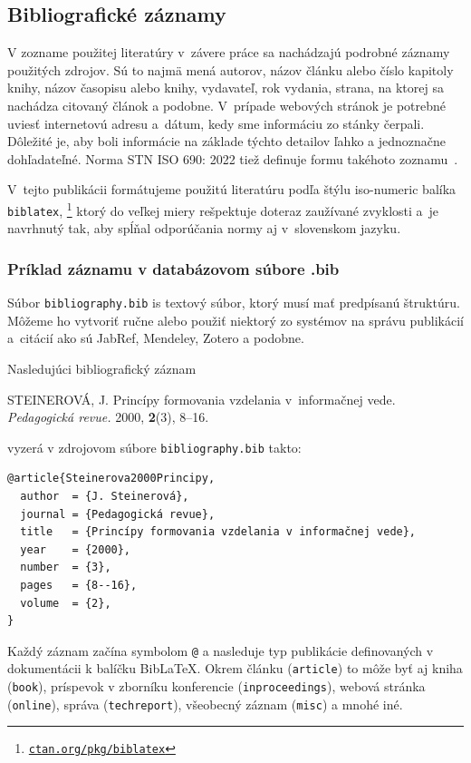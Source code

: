\documentclass[../../../thesis.tex]{subfiles}
\begin{document}
\subsection{Bibliografické záznamy}
V zozname použitej literatúry v~závere práce sa nachádzajú
podrobné záznamy použitých zdrojov.
Sú to najmä mená autorov, názov článku alebo číslo kapitoly
knihy, názov časopisu alebo knihy, vydavateľ, rok vydania,
strana, na ktorej sa nachádza citovaný článok a podobne.
V~prípade webových stránok je potrebné uviesť internetovú adresu
a~dátum, kedy sme informáciu zo stánky čerpali.
Dôležité je, aby boli informácie na základe týchto detailov
ľahko a jednoznačne dohľadateľné.
Norma STN ISO 690: 2022 tiež definuje formu takéhoto zoznamu~\cite{iso690}.

V~tejto publikácii formátujeme použitú literatúru
podľa štýlu iso-numeric \cite{Hoftich2022iso690} balíka \texttt{biblatex},
\footnote{\href{https://ctan.org/pkg/biblatex}{\texttt{ctan.org/pkg/biblatex}}}
ktorý do veľkej miery rešpektuje doteraz zaužívané zvyklosti
a~je navrhnutý tak,
aby spĺňal odporúčania normy aj v~slovenskom jazyku.

\subsubsection{Príklad záznamu v databázovom súbore .bib}\label{sec:citExample}
Súbor \texttt{bibliography.bib} is textový súbor, ktorý musí mať predpísanú štruktúru.
Môžeme ho vytvoriť ručne alebo použiť niektorý zo systémov na správu publikácií a~citácií ako sú JabRef, Mendeley, Zotero a podobne.

Nasledujúci bibliografický záznam
\begin{trivlist}
  \item STEINEROVÁ, J. Princípy formovania vzdelania
  v~informačnej vede. \textit{Pedagogická revue.} 2000, \textbf{2}(3), 8--16.
\end{trivlist}
vyzerá v zdrojovom súbore \texttt{bibliography.bib} takto:
\begin{verbatim}
@article{Steinerova2000Principy,
  author  = {J. Steinerová},
  journal = {Pedagogická revue},
  title   = {Princípy formovania vzdelania v informačnej vede},
  year    = {2000},
  number  = {3},
  pages   = {8--16},
  volume  = {2},
}
\end{verbatim}

Každý záznam začína symbolom \verb|@| a nasleduje typ publikácie definovaných v dokumentácii k balíčku Bib\LaTeX.
Okrem článku (\verb|article|) to môže byť aj kniha (\verb|book|),
príspevok v zborníku konferencie (\verb|inproceedings|),
webová stránka (\verb|online|),
správa (\verb|techreport|),
všeobecný záznam (\verb|misc|) a mnohé iné.
\end{document}
